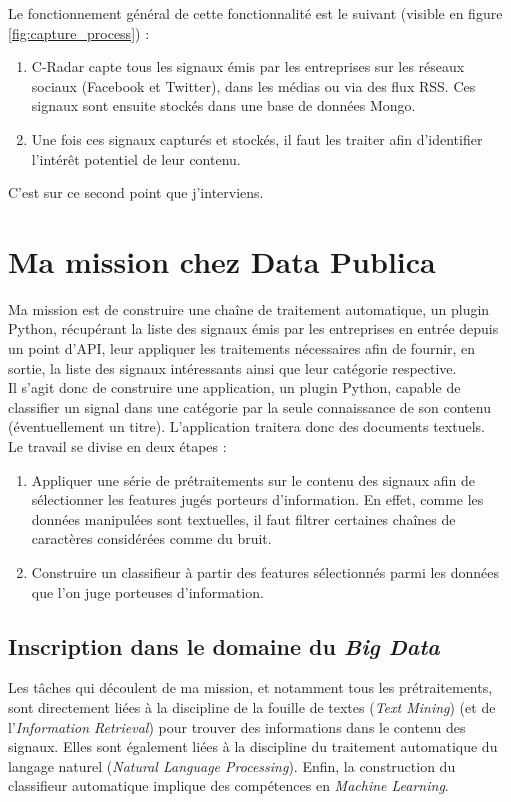     Le fonctionnement général de cette fonctionnalité est le suivant (visible en figure \ref{fig:capture_process}) :
    \begin{enumerate}
        \item C-Radar capte tous les signaux émis par les entreprises sur les réseaux sociaux (Facebook et Twitter), dans les médias ou via des flux RSS. Ces signaux sont ensuite stockés dans une base de données Mongo.
        \item Une fois ces signaux capturés et stockés, il faut les traiter afin d'identifier l'intérêt potentiel de leur contenu.
    \end{enumerate}
    C'est sur ce second point que j'interviens.

\section{Ma mission chez Data Publica} %
\label{sec:ma_mission_chez_data_publica}
    Ma mission est de construire une chaîne de traitement automatique, un plugin Python, récupérant la liste des signaux émis par les entreprises en entrée depuis un point d'API, leur appliquer les traitements nécessaires afin de fournir, en sortie, la liste des signaux intéressants ainsi que leur catégorie respective.\\

    Il s'agit donc de construire une application, un plugin Python, capable de classifier un signal dans une catégorie par la seule connaissance de son contenu (éventuellement un titre). L'application traitera donc des documents textuels.\\
    Le travail se divise en deux étapes :
    \begin{enumerate}
        \item Appliquer une série de prétraitements sur le contenu des signaux afin de sélectionner les features jugés porteurs d'information. En effet, comme les données manipulées sont textuelles, il faut filtrer certaines chaînes de caractères considérées comme du bruit.
        \item Construire un classifieur à partir des features sélectionnés parmi les données que l'on juge porteuses d'information.
    \end{enumerate}

    \subsection{Inscription dans le domaine du \textit{Big Data}}
        Les tâches qui découlent de ma mission, et notamment tous les prétraitements, sont directement liées à la discipline de la fouille de textes (\textit{Text Mining}) (et de l'\textit{Information Retrieval}) pour trouver des informations dans le contenu des signaux. Elles sont également liées à la discipline du traitement automatique du langage naturel (\textit{Natural Language Processing}). Enfin, la construction du classifieur automatique implique des compétences en \textit{Machine Learning}.

